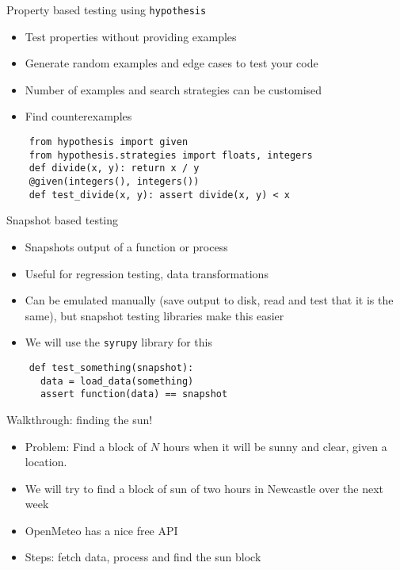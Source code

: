 \documentclass[11pt,xcolor={dvipsnames},hyperref={pdftex,pdfpagemode=UseNone,hidelinks,pdfdisplaydoctitle=true},usepdftitle=false]{beamer}
\begin{document}
\begin{frame}[fragile]{Property based testing using \texttt{hypothesis}}
\label{property-based-testing-using-hypothesis}
\begin{itemize}
\item
  Test properties without providing examples
\item
  Generate random examples and edge cases to test your code
\item
  Number of examples and search strategies can be customised
\item
  Find counterexamples
\end{itemize}
\vskip 0.5cm
\begin{verbatim}
    from hypothesis import given
    from hypothesis.strategies import floats, integers
    def divide(x, y): return x / y
    @given(integers(), integers())
    def test_divide(x, y): assert divide(x, y) < x
\end{verbatim}

\end{frame}


\begin{frame}[fragile]{Snapshot based testing}
\label{snapshot-based-testing}
\begin{itemize}
\item
  Snapshots output of a function or process
\item
  Useful for regression testing, data transformations
\item
  Can be emulated manually (save output to disk, read and test that it
  is the same), but snapshot testing libraries make this easier
\item We will use the \texttt{syrupy} library for this
\end{itemize}
\vskip 0.3cm
\begin{verbatim}
    def test_something(snapshot):
      data = load_data(something)
      assert function(data) == snapshot
\end{verbatim}
\end{frame}


\begin{frame}{Walkthrough: finding the sun!}
\label{walkthrough-finding-the-sun}
\begin{itemize}
\item
  \alert{Problem}: Find a block of $N$ hours when it will be sunny and
  clear, given a location.
\item
  We will try to find a block of sun of two hours in Newcastle over the
  next week
\item
  OpenMeteo has a nice free API
\item
  Steps: fetch data, process and find the sun block
\end{itemize}
\end{frame}
\end{document}
